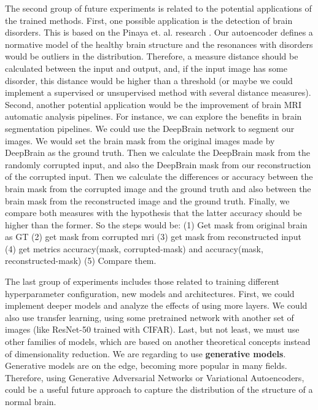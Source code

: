 The second group of future experiments is related to the potential applications of the trained methods. First, one possible application is the detection of brain disorders. This is based on the Pinaya et. al. research \cite{pinaya2019}. Our autoencoder defines a normative model of the healthy brain structure and the resonances with disorders would be outliers in the distribution. Therefore, a measure distance should be calculated between the input and output, and, if the input image has some disorder, this distance would be higher than a threshold (or maybe we could implement a supervised or unsupervised method with several distance measures). Second, another potential application would be the improvement of brain MRI automatic analysis pipelines. For instance, we can explore the benefits in brain segmentation pipelines. We could use the DeepBrain network to segment our images. We would set the brain mask from the original images made by DeepBrain as the ground truth. Then we calculate the DeepBrain mask from the randomly corrupted input, and also the DeepBrain mask from our reconstruction of the corrupted input. Then we calculate the differences or accuracy between the brain mask from the corrupted image and the ground truth and also between the brain mask from the reconstructed image and the ground truth. Finally, we compare both measures with the hypothesis that the latter accuracy should be higher than the former. So the steps would be: (1) Get mask from original brain as GT (2) get mask from corrupted mri (3) get mask from reconstructed input (4) get metrics accuracy(mask, corrupted-mask) and accuracy(mask, reconstructed-mask) (5) Compare them.


The last group of experiments includes those related to training different hyperparameter configuration, new models and architectures. First, we could implement deeper models and analyze the effects of using more layers. We could also use transfer learning, using some pretrained network with another set of images (like ResNet-50 trained with CIFAR). Last, but not least, we must use other families of models, which are based on another theoretical concepts instead of dimensionality reduction. We are regarding to use \textbf{generative models}. Generative models are on the edge, becoming more popular in many fields. Therefore, using Generative Adversarial Networks or Variational Autoencoders, could be a useful future approach to capture the distribution of the structure of a normal brain. 
